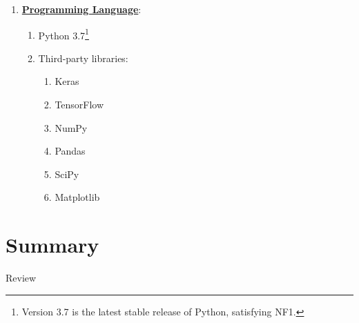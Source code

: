 \begin{enumerate}
    \item \underline{\textbf{Programming Language}}: 
    \begin{enumerate}
        \item Python 3.7\footnote{Version 3.7 is the latest stable release of Python, satisfying NF1.}
        \item Third-party libraries:
        \begin{enumerate}
        	\item Keras
        	\item TensorFlow
            \item NumPy
            \item Pandas
            \item SciPy
            \item Matplotlib
        \end{enumerate}
    \end{enumerate}
\end{enumerate}


\section{Summary}

Review
